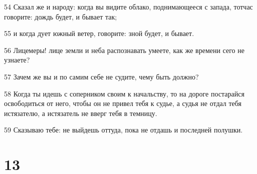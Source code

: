 \par 54 Сказал же и народу: когда вы видите облако, поднимающееся с запада, тотчас говорите: дождь будет, и бывает так;
\par 55 и когда дует южный ветер, говорите: зной будет, и бывает.
\par 56 Лицемеры! лице земли и неба распознавать умеете, как же времени сего не узнаете?
\par 57 Зачем же вы и по самим себе не судите, чему быть должно?
\par 58 Когда ты идешь с соперником своим к начальству, то на дороге постарайся освободиться от него, чтобы он не привел тебя к судье, а судья не отдал тебя истязателю, а истязатель не вверг тебя в темницу.
\par 59 Сказываю тебе: не выйдешь оттуда, пока не отдашь и последней полушки.

\chapter{13}

